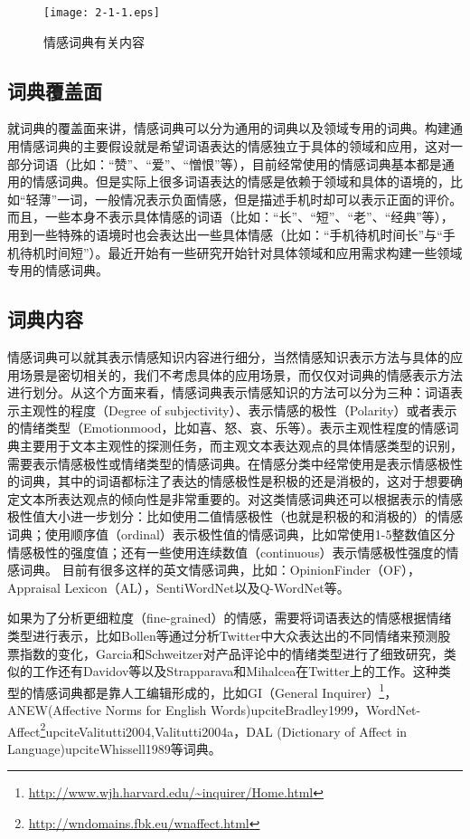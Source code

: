 \begin{figure}[htp]
\centering
\texttt{[image: 2-1-1.eps]}
\caption{情感词典有关内容}
\label{fig2-1-1}
\end{figure}

\subsection{词典覆盖面}
就词典的覆盖面来讲，情感词典可以分为通用的词典以及领域专用的词典。构建通用情感词典的主要假设就是希望词语表达的情感独立于具体的领域和应用，这对一部分词语（比如：“赞”、“爱”、“憎恨”等），目前经常使用的情感词典基本都是通用的情感词典。但是实际上很多词语表达的情感是依赖于领域和具体的语境的，比如“轻薄”一词，一般情况表示负面情感，但是描述手机时却可以表示正面的评价。而且，一些本身不表示具体情感的词语（比如：“长”、“短”、“老”、“经典”等），用到一些特殊的语境时也会表达出一些具体情感（比如：“手机待机时间长”与“手机待机时间短”）。最近开始有一些研究开始针对具体领域和应用需求构建一些领域专用的情感词典。

\subsection{词典内容}
情感词典可以就其表示情感知识内容进行细分，当然情感知识表示方法与具体的应用场景是密切相关的，我们不考虑具体的应用场景，而仅仅对词典的情感表示方法进行划分。从这个方面来看，情感词典表示情感知识的方法可以分为三种：词语表示主观性的程度（Degree of subjectivity）、表示情感的极性（Polarity）或者表示的情绪类型（Emotion\/mood，比如喜、怒、哀、乐等）。表示主观性程度的情感词典主要用于文本主观性的探测任务，而主观文本表达观点的具体情感类型的识别，需要表示情感极性或情绪类型的情感词典。在情感分类中经常使用是表示情感极性的词典，其中的词语都标注了表达的情感极性是积极的还是消极的，这对于想要确定文本所表达观点的倾向性是非常重要的。对这类情感词典还可以根据表示的情感极性值大小进一步划分：比如使用二值情感极性（也就是积极的和消极的）的情感词典；使用顺序值（ordinal）表示极性值的情感词典，比如常使用1-5整数值区分情感极性的强度值；还有一些使用连续数值（continuous）表示情感极性强度的情感词典。
目前有很多这样的英文情感词典，比如：OpinionFinder（OF），Appraisal Lexicon（AL），SentiWordNet以及Q-WordNet等。

如果为了分析更细粒度（fine-grained）的情感，需要将词语表达的情感根据情绪类型进行表示，比如Bollen等通过分析Twitter中大众表达出的不同情绪来预测股票指数的变化，Garcia和Schweitzer对产品评论中的情绪类型进行了细致研究，类似的工作还有Davidov等以及Strapparava和Mihalcea在Twitter上的工作。这种类型的情感词典都是靠人工编辑形成的，比如GI（General Inquirer）\footnote{\url{http://www.wjh.harvard.edu/~inquirer/Home.html}}，ANEW(Affective Norms for English Words)upcite{Bradley1999}，WordNet-Affect\footnote{\url{http://wndomains.fbk.eu/wnaffect.html}}upcite{Valitutti2004,Valitutti2004a}，DAL (Dictionary of Affect in Language)upcite{Whissell1989}等词典。


